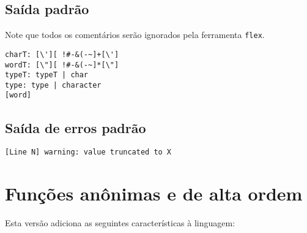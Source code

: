 \documentclass{sftex/sftex}
\begin{document}
\subsection{Saída padrão}

Note que todos os comentários serão ignorados pela ferramenta \verb!flex!.

\begin{verbatim}
charT: [\'][ !#-&(-~]+[\']
wordT: [\"][ !#-&(-~]*[\"]
typeT: typeT | char
type: type | character
[word]
\end{verbatim}

\subsection{Saída de erros padrão}

\begin{verbatim}
[Line N] warning: value truncated to X
\end{verbatim}

\section{Funções anônimas e de alta ordem}

Esta versão adiciona as seguintes características à linguagem:
\end{document}
